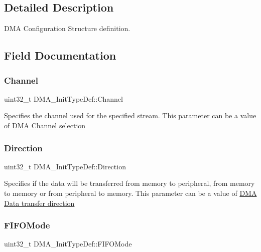 \subsection{Detailed Description}
D\+MA Configuration Structure definition. 

\subsection{Field Documentation}
\mbox{\label{struct_d_m_a___init_type_def_af62608eb25864208cae5d59acef282a6}} 
\subsubsection{\texorpdfstring{Channel}{Channel}}
{\footnotesize\ttfamily uint32\+\_\+t D\+M\+A\+\_\+\+Init\+Type\+Def\+::\+Channel}

Specifies the channel used for the specified stream. This parameter can be a value of \hyperlink{group___d_m_a___channel__selection}{D\+MA Channel selection} \mbox{\label{struct_d_m_a___init_type_def_a0145b5d0e074fa8e2e185ecf2c4a15ca}} 
\subsubsection{\texorpdfstring{Direction}{Direction}}
{\footnotesize\ttfamily uint32\+\_\+t D\+M\+A\+\_\+\+Init\+Type\+Def\+::\+Direction}

Specifies if the data will be transferred from memory to peripheral, from memory to memory or from peripheral to memory. This parameter can be a value of \hyperlink{group___d_m_a___data__transfer__direction}{D\+MA Data transfer direction} \mbox{\label{struct_d_m_a___init_type_def_acda0396cf55baab166f51b1ea1deed0d}} 
\subsubsection{\texorpdfstring{F\+I\+F\+O\+Mode}{FIFOMode}}
{\footnotesize\ttfamily uint32\+\_\+t D\+M\+A\+\_\+\+Init\+Type\+Def\+::\+F\+I\+F\+O\+Mode}

